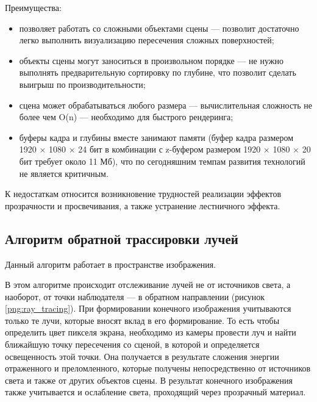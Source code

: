 Преимущества:
\begin{itemize}
	\item позволяет работать со сложными объектами сцены — позволит достаточно легко выполнить визуализацию пересечения сложных поверхностей;
	\item объекты сцены могут заноситься в произвольном порядке — не нужно выполнять предварительную сортировку по глубине, что позволит сделать выигрыш по производительности;
	\item сцена может обрабатываться любого размера — вычислительная сложность не более чем O(n) — необходимо для быстрого рендеринга;
	\item буферы кадра и глубины вместе занимают памяти (буфер кадра размером 1920 $\times$ 1080 $\times$ 24 бит в комбинации с z-буфером размером 1920 $\times$ 1080 $\times$ 20 бит требует около 11 Мб), что по сегодняшним темпам развития технологий не является критичным. 
\end{itemize}

К недостаткам относится возникновение трудностей реализации эффектов прозрачности и просвечивания, а также устранение лестничного эффекта.

\subsection{Алгоритм обратной трассировки лучей}
Данный алгоритм работает в пространстве изображения.

В этом алгоритме происходит отслеживание лучей не от источников света, а наоборот, от точки наблюдателя — в обратном направлении (рисунок \ref{png:ray_tracing}). При формировании конечного изображения учитываются только те лучи, которые вносят вклад в его формирование. То есть чтобы определить цвет пикселя экрана, необходимо из камеры провести луч и найти ближайшую точку пересечения со сценой, в которой и определяется освещенность этой точки. Она получается в результате сложения энергии отраженного и преломленного, которые получены непосредственно от источников света и также от других объектов сцены. В результат конечного изображения также учитывается и ослабление света, проходящий через прозрачный материал.

\begin{figure}[H]
\end{figure}

